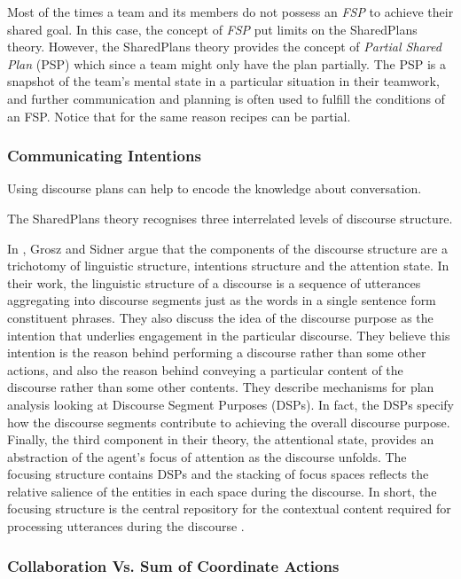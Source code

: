 \documentclass[11pt]{article}
\begin{document}
Most of the times a team and its members do not possess an \textit{FSP} to
achieve their shared goal. In this case, the concept of \textit{FSP} put limits
on the SharedPlans theory. However, the SharedPlans theory provides the concept
of \textit{Partial Shared Plan} (PSP) which since a team might only have the
plan partially. The PSP is a snapshot of the team's mental state in a particular
situation in their teamwork, and further communication and planning is often
used to fulfill the conditions of an FSP. Notice that for the same reason
recipes can be partial.

\subsubsection{Communicating Intentions}

Using discourse plans can help to encode the knowledge about conversation.

The SharedPlans theory recognises three interrelated levels of discourse
structure.

In \cite{grosz:plans-discourse}, Grosz and Sidner argue that the components of
the discourse structure are a trichotomy of linguistic structure, intentions
structure and the attention state. In their work, the linguistic structure of a
discourse is a sequence of utterances aggregating into discourse segments just
as the words in a single sentence form constituent phrases. They also discuss
the idea of the discourse purpose as the intention that underlies engagement in
the particular discourse. They believe this intention is the reason behind
performing a discourse rather than some other actions, and also the reason
behind conveying a particular content of the discourse rather than some other
contents. They describe mechanisms for plan analysis looking at Discourse
Segment Purposes (DSPs). In fact, the DSPs specify how the discourse segments
contribute to achieving the overall discourse purpose. Finally, the third
component in their theory, the attentional state, provides an abstraction of the
agent's focus of attention as the discourse unfolds. The focusing structure
contains DSPs and the stacking of focus spaces reflects the relative salience of
the entities in each space during the discourse. In short, the focusing
structure is the central repository for the contextual content required for
processing utterances during the discourse \cite{grosz:plans-discourse}.

\subsubsection{Collaboration Vs. Sum of Coordinate Actions}
\end{document}
